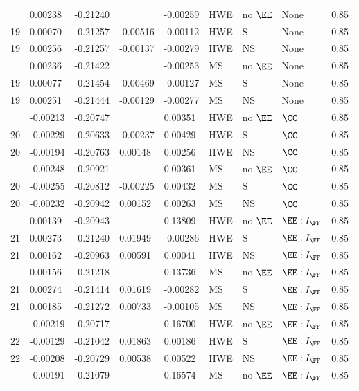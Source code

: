 \begin{longtable}[t]{lllllllll}
\endfoot
\bottomrule
\endlastfoot
19 & 0.00238 & -0.21240 &  & -0.00259 & HWE & no $\EE$ & None & 0.85\\
19 & 0.00070 & -0.21257 & -0.00516 & -0.00112 & HWE & S & None & 0.85\\
19 & 0.00256 & -0.21257 & -0.00137 & -0.00279 & HWE & NS & None & 0.85\\
\addlinespace
19 & 0.00236 & -0.21422 &  & -0.00253 & MS & no $\EE$ & None & 0.85\\
19 & 0.00077 & -0.21454 & -0.00469 & -0.00127 & MS & S & None & 0.85\\
19 & 0.00251 & -0.21444 & -0.00129 & -0.00277 & MS & NS & None & 0.85\\
\addlinespace
20 & -0.00213 & -0.20747 &  & 0.00351 & HWE & no $\EE$ & $\CC$ & 0.85\\
20 & -0.00229 & -0.20633 & -0.00237 & 0.00429 & HWE & S & $\CC$ & 0.85\\
20 & -0.00194 & -0.20763 & 0.00148 & 0.00256 & HWE & NS & $\CC$ & 0.85\\
\addlinespace
20 & -0.00248 & -0.20921 &  & 0.00361 & MS & no $\EE$ & $\CC$ & 0.85\\
20 & -0.00255 & -0.20812 & -0.00225 & 0.00432 & MS & S & $\CC$ & 0.85\\
20 & -0.00232 & -0.20942 & 0.00152 & 0.00263 & MS & NS & $\CC$ & 0.85\\
\addlinespace
21 & 0.00139 & -0.20943 &  & 0.13809 & HWE & no $\EE$ & $\EE:I_{\FF}$ & 0.85\\
21 & 0.00273 & -0.21240 & 0.01949 & -0.00286 & HWE & S & $\EE:I_{\FF}$ & 0.85\\
21 & 0.00162 & -0.20963 & 0.00591 & 0.00041 & HWE & NS & $\EE:I_{\FF}$ & 0.85\\
\addlinespace
21 & 0.00156 & -0.21218 &  & 0.13736 & MS & no $\EE$ & $\EE:I_{\FF}$ & 0.85\\
21 & 0.00274 & -0.21414 & 0.01619 & -0.00282 & MS & S & $\EE:I_{\FF}$ & 0.85\\
21 & 0.00185 & -0.21272 & 0.00733 & -0.00105 & MS & NS & $\EE:I_{\FF}$ & 0.85\\
\addlinespace
22 & -0.00219 & -0.20717 &  & 0.16700 & HWE & no $\EE$ & $\EE:I_{\FF}$ & 0.85\\
22 & -0.00129 & -0.21042 & 0.01863 & 0.00186 & HWE & S & $\EE:I_{\FF}$ & 0.85\\
22 & -0.00208 & -0.20729 & 0.00538 & 0.00522 & HWE & NS & $\EE:I_{\FF}$ & 0.85\\
\addlinespace
22 & -0.00191 & -0.21079 &  & 0.16574 & MS & no $\EE$ & $\EE:I_{\FF}$ & 0.85\\

\end{longtable}
